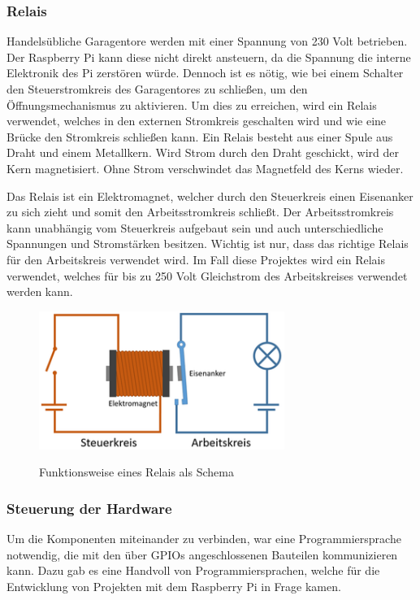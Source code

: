  \subsubsection{Relais}
Handelsübliche Garagentore werden mit einer Spannung von 230 Volt betrieben. Der Raspberry Pi kann diese nicht direkt ansteuern, da die Spannung die interne Elektronik des Pi zerstören würde. Dennoch ist es nötig, wie bei einem Schalter den Steuerstromkreis des Garagentores zu schließen, um den Öffnungsmechanismus zu aktivieren. Um dies zu erreichen, wird ein Relais verwendet, welches in den externen Stromkreis geschalten wird und wie eine Brücke den Stromkreis schließen kann. Ein Relais besteht aus einer Spule aus Draht und einem Metallkern. Wird Strom durch den Draht geschickt, wird der Kern magnetisiert. Ohne Strom verschwindet das Magnetfeld des Kerns wieder.

Das Relais ist ein Elektromagnet, welcher durch den Steuerkreis einen Eisenanker zu sich zieht und somit den Arbeitsstromkreis schließt. Der Arbeitsstromkreis kann unabhängig vom Steuerkreis aufgebaut sein und auch unterschiedliche Spannungen und Stromstärken besitzen. Wichtig ist nur, dass das richtige Relais für den Arbeitskreis verwendet wird. Im Fall diese Projektes wird ein Relais verwendet, welches für bis zu 250 Volt Gleichstrom des Arbeitskreises verwendet werden kann.
\cite{Relais}
\begin{figure}[H]
  \centering
  \includegraphics[width=8cm]{pics/Relais.png}
  \caption{Funktionsweise eines Relais als Schema}
  \cite{RelaisBild}
\end{figure}


\subsubsection{Steuerung der Hardware}
Um die Komponenten miteinander zu verbinden, war eine Programmiersprache notwendig, die mit den über GPIOs angeschlossenen Bauteilen kommunizieren kann. Dazu gab es eine Handvoll von Programmiersprachen, welche für die Entwicklung von Projekten mit dem Raspberry Pi in Frage kamen.

